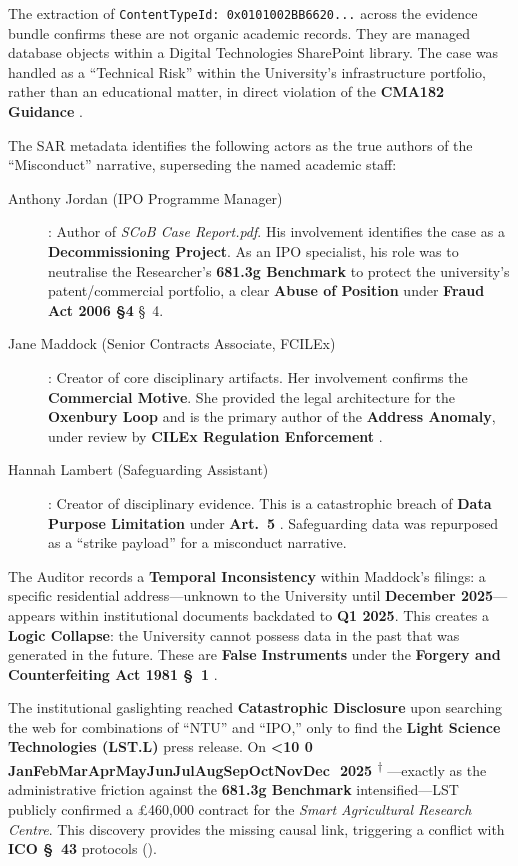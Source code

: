 \documentclass{EMBASSY}
\DeclareRobustCommand{\gmt}[3]{%
    \texorpdfstring{%
        {\color{DateGold}\textbf{%
            \ifnum#1<10 0\fi#1\,\textperiodcentered\,%
            \ifcase#2\or Jan\or Feb\or Mar\or Apr\or May\or Jun\or Jul\or Aug\or Sep\or Oct\or Nov\or Dec\fi
            \,\textperiodcentered\,20#3%
            \textsuperscript{$\dagger$}%
        }}%
    }{%
        (#1/#2/#3)%
    }%
}
\begin{document}
The extraction of \texttt{ContentTypeId: 0x0101002BB6620...} across the evidence bundle confirms these are not organic academic records. They are managed database objects within a Digital Technologies SharePoint library. The case was handled as a ``Technical Risk'' within the University’s infrastructure portfolio, rather than an educational matter, in direct violation of the \textbf{CMA182 Guidance} \cite{CMA182}.

The SAR metadata identifies the following actors as the true authors of the ``Misconduct'' narrative, superseding the named academic staff:

\begin{description}
	\item[Anthony Jordan (IPO Programme Manager)]: Author of \textit{SCoB Case Report.pdf}. His involvement identifies the case as a \textbf{Decommissioning Project}. As an IPO specialist, his role was to neutralise the Researcher’s \textbf{681.3g Benchmark} to protect the university's patent/commercial portfolio, a clear \textbf{Abuse of Position} under \textbf{Fraud Act 2006 \S4} \cite{FraudAct06} \S~4.
	\item[Jane Maddock (Senior Contracts Associate, FCILEx)]: Creator of core disciplinary artifacts. Her involvement confirms the \textbf{Commercial Motive}. She provided the legal architecture for the \textbf{Oxenbury Loop} and is the primary author of the \textbf{Address Anomaly}, under review by \textbf{CILEx Regulation Enforcement} \cite{CILEX-ENF-26}.
	\item[Hannah Lambert (Safeguarding Assistant)]: Creator of disciplinary evidence. This is a catastrophic breach of \textbf{Data Purpose Limitation} under \textbf{Art.~5} \cite{UKGDPR}. Safeguarding data was repurposed as a ``strike payload'' for a misconduct narrative.
\end{description}

\noindent The Auditor records a \textbf{Temporal Inconsistency} within Maddock’s filings: a specific residential address---unknown to the University until \textbf{December 2025}---appears within institutional documents backdated to \textbf{Q1 2025}. This creates a \textbf{Logic Collapse}: the University cannot possess data in the past that was generated in the future. These are \textbf{False Instruments} under the \textbf{Forgery and Counterfeiting Act 1981 \S~1} \cite{FCA81}.

The institutional gaslighting reached \textbf{Catastrophic Disclosure} upon searching the web for combinations of ``NTU'' and ``IPO,'' only to find the \textbf{Light Science Technologies (LST.L)} press release. On \gmt{27}{10}{25}---exactly as the administrative friction against the \textbf{681.3g Benchmark} intensified---LST publicly confirmed a \pounds460,000 contract for the \textit{Smart Agricultural Research Centre}. This discovery provides the missing causal link, triggering a conflict with \textbf{ICO \S~43} protocols (\cite{ICO-Section43}).
\end{document}
